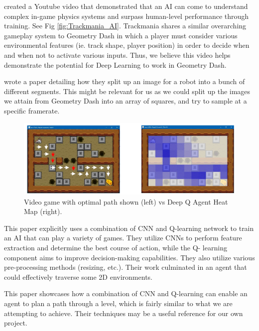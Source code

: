 \documentclass{article} %
\begin{document}
\cite{Trackmania+AI} created a Youtube video that demonstrated that an AI 
can come to understand complex in-game physics systems and surpass
human-level performance through training. See Fig \ref{fig:Trackmania_AI}.
Trackmania shares a similar overarching gameplay system to Geometry Dash in 
which a player must 
consider various environmental features (ie. track shape, player 
position) in order to decide when and when not to activate various 
inputs. Thus, we believe this video helps demonstrate the potential 
for Deep Learning to work in Geometry Dash.

\cite{Robot+Object+Avoidance+Method} wrote a paper detailing how 
they split up an image for a robot into a bunch of different segments. 
This might be relevant for us as we could split up the images we attain
from Geometry Dash into an array of squares, and try to sample at a
specific framerate.

\begin{figure}[!h]
\begin{center}
\includegraphics[width=1.0\textwidth]{Figs/Q_Learn_Game.png}
\end{center}
\caption{Video game with optimal path shown (left) vs Deep Q Agent Heat Map 
(right). \citep{General+Video+Game+AI:+Learning+from+Screen+Capture}}
\label{fig:Q_Learn_game}
\end{figure}

This paper explicitly uses a combination of CNN and Q-learning network to 
train an AI that can play a variety of games. They utilize CNNs to perform 
feature extraction and determine the best course of action, while the Q-
learning component aims to improve decision-making capabilities. They also 
utilize various pre-processing methods (resizing, etc.). Their work 
culminated in an agent that could effectively traverse some 2D environments.
	
This paper showcases how a combination of CNN and Q-learning can enable an 
agent to plan a path through a level, which is fairly similar to what we are 
attempting to achieve. Their techniques may be a useful reference for our own 
project.
\end{document}
